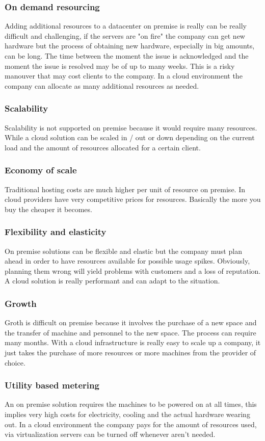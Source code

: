 \subsubsection{On demand resourcing}
Adding additional resources to a datacenter on premise is really can be really difficult and challenging, if the servers are "on fire" the company can get new hardware but the process of obtaining new hardware, especially in big amounts, can be long. The time between the moment the issue is acknowledged and the moment the issue is resolved may be of up to many weeks. \n
This is a risky manouver that may cost clients to the company. In a cloud environment the company can allocate as many additional resources as needed.
\subsubsection{Scalability}
Scalability is not supported on premise because it would require many resources. While a cloud solution can be scaled in / out or down depending on the current load and the amount of resources allocated for a certain client.
\subsubsection{Economy of scale}
Traditional hosting costs are much higher per unit of resource on premise. In cloud providers have very competitive prices for resources. Basically the more you buy the cheaper it becomes.
\subsubsection{Flexibility and elasticity}
On premise solutions can be flexible and elastic but the company must plan ahead in order to have resources available for possible usage spikes. Obviously, planning them wrong will yield problems with customers and a loss of reputation. \n
A cloud solution is really performant and can adapt to the situation.
\subsubsection{Growth}
Groth is difficult on premise because it involves the purchase of a new space and the transfer of machine and personnel to the new space. The process can require many months. With a cloud infrastructure is really easy to scale up a company, it just takes the purchase of more resources or more machines from the provider of choice.
\subsubsection{Utility based metering}
An on premise solution requires the machines to be powered on at all times, this implies very high costs for electricity, cooling and the actual hardware wearing out. \n
In a cloud environment the company pays for the amount of resources used, via virtualization servers can be turned off whenever aren't needed.
